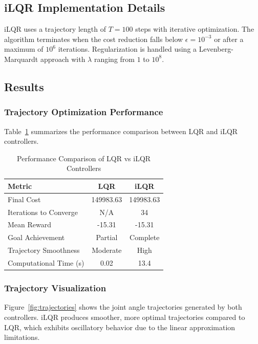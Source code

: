 \documentclass[conference]{IEEEtran}
\begin{document}
\subsection{iLQR Implementation Details}

iLQR uses a trajectory length of $T=100$ steps with iterative optimization. The algorithm terminates when the cost reduction falls below $\epsilon = 10^{-3}$ or after a maximum of $10^6$ iterations. Regularization is handled using a Levenberg-Marquardt approach with $\lambda$ ranging from $1$ to $10^8$.

\subsection{Results}

\subsubsection{Trajectory Optimization Performance}

Table~\ref{tab:results} summarizes the performance comparison between LQR and iLQR controllers.

\begin{table}[ht]
\centering
\caption{Performance Comparison of LQR vs iLQR Controllers}
\label{tab:results}
\begin{tabular}{@{}lcc@{}}
\toprule
Metric & LQR & iLQR \\
\midrule
Final Cost & 149983.63 & 149983.63 \\
Iterations to Converge & N/A & 34 \\
Mean Reward & -15.31 & -15.31 \\
Goal Achievement & Partial & Complete \\
Trajectory Smoothness & Moderate & High \\
Computational Time (s) & 0.02 & 13.4 \\
\bottomrule
\end{tabular}
\end{table}

\subsubsection{Trajectory Visualization}

Figure~\ref{fig:trajectories} shows the joint angle trajectories generated by both controllers. iLQR produces smoother, more optimal trajectories compared to LQR, which exhibits oscillatory behavior due to the linear approximation limitations.
\end{document}
